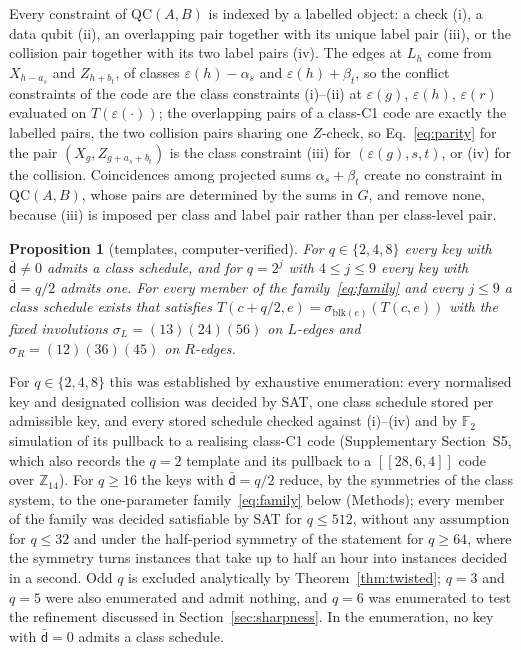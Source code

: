 \documentclass[reprint,twocolumn,superscriptaddress,nofootinbib]{revtex4-2}
\theoremstyle{plain}
\newtheorem{proposition}[theorem]{Proposition}
\newcommand{\F}{\mathbb{F}_2}
\newcommand{\colbar}{\bar{\mathsf{d}}} %
\begin{document}
Every constraint of $\mathrm{QC}(A,B)$ is indexed by a labelled object: a
check (i), a data qubit (ii), an overlapping pair together with its unique
label pair (iii), or the collision pair together with its two label pairs
(iv). The edges at $L_h$ come from $X_{h-a_s}$ and $Z_{h+b_t}$, of classes
$\varepsilon(h)-\alpha_s$ and $\varepsilon(h)+\beta_t$, so the conflict
constraints of the code are the class constraints (i)--(ii) at
$\varepsilon(g)$, $\varepsilon(h)$, $\varepsilon(r)$ evaluated on
$T(\varepsilon(\cdot))$; the overlapping pairs of a class-C1 code are
exactly the labelled pairs, the two collision pairs sharing one $Z$-check,
so Eq.~\eqref{eq:parity} for the pair $(X_g,Z_{g+a_s+b_t})$ is the class
constraint (iii) for $(\varepsilon(g),s,t)$, or (iv) for the collision.
Coincidences among projected sums $\alpha_s+\beta_t$ create no constraint
in $\mathrm{QC}(A,B)$, whose pairs are determined by the sums in $G$, and
remove none, because (iii) is imposed per class and label pair rather than
per class-level pair.

\begin{proposition}[templates, computer-verified]
\label{prop:template}
For $q\in\{2,4,8\}$ every key with $\colbar\neq0$ admits a class schedule,
and for $q=2^j$ with $4\le j\le9$ every key with $\colbar=q/2$ admits one.
For every member of the family~\eqref{eq:family} and every $j\le9$ a class
schedule exists that satisfies $T(c+q/2,e)=\sigma_{\mathrm{blk}(e)}(T(c,e))$
with the fixed involutions $\sigma_L=(13)(24)(56)$ on $L$-edges and
$\sigma_R=(12)(36)(45)$ on $R$-edges.
\end{proposition}

For $q\in\{2,4,8\}$ this was established by exhaustive enumeration: every
normalised key and designated collision was decided by SAT, one class
schedule stored per admissible key, and every stored schedule checked
against (i)--(iv) and by $\F$ simulation of its pullback to a realising
class-C1 code (Supplementary Section~S5, which also records the $q=2$
template and its pullback to a $[[28,6,4]]$ code over $\mathbb{Z}_{14}$).
For $q\ge16$ the keys with $\colbar=q/2$ reduce, by the symmetries of the
class system, to the one-parameter family~\eqref{eq:family} below
(Methods); every member of the family was decided satisfiable by SAT for
$q\le512$, without any assumption for $q\le32$ and under the half-period
symmetry of the statement for $q\ge64$, where the symmetry turns instances
that take up to half an hour into instances decided in a second. Odd $q$
is excluded analytically by
Theorem~\ref{thm:twisted}; $q=3$ and $q=5$ were also enumerated and admit
nothing, and $q=6$ was enumerated to test the refinement discussed in
Section~\ref{sec:sharpness}. In the enumeration, no key with $\colbar=0$
admits a class schedule.
\end{document}
